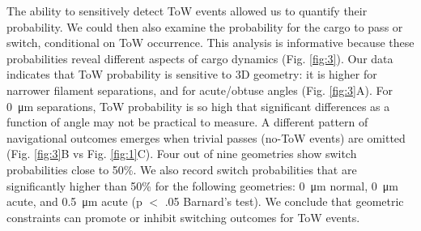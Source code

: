 The ability to sensitively detect ToW events allowed us to quantify their probability. We could then also examine the probability for the cargo to pass or switch, conditional on ToW occurrence. This analysis is informative because these probabilities reveal different aspects of cargo dynamics (Fig. \ref{fig:3}). Our data indicates that ToW probability is sensitive to 3D geometry: it is higher for narrower filament separations, and for acute/obtuse angles (Fig. \ref{fig:3}A). For \SI{0}{\micro\meter} separations, ToW probability is so high that significant differences as a function of angle may not be practical to measure. A different pattern of navigational outcomes emerges when trivial passes (no-ToW events) are omitted (Fig. \ref{fig:3}B vs Fig. \ref{fig:1}C). Four out of nine geometries show switch probabilities close to 50\%. We also record switch probabilities that are significantly higher than 50\% for the following geometries: \SI{0}{\micro\meter} normal, \SI{0}{\micro\meter} acute, and \SI{.5}{\micro\meter} acute (p $<$ .05 Barnard's test). We conclude that geometric constraints can promote or inhibit switching outcomes for ToW events.

